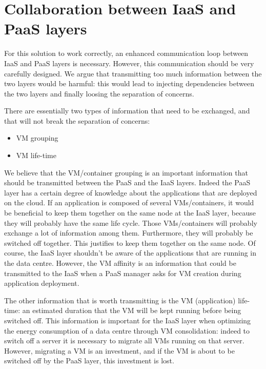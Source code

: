 
\section{Collaboration between IaaS and PaaS layers}
\label{sec:iaaspaas}

For this solution to work correctly, an enhanced communication loop between IaaS and PaaS layers is necessary.
However, this communication should be very carefully designed.
We argue that transmitting too much information between the two layers would be harmful: this would lead to injecting dependencies between the two layers and finally loosing the separation of concerns. 

There are essentially two types of information that need to be exchanged, and that will not break the separation of concerns:
\begin{itemize}
  \item VM grouping
  \item VM life-time
\end{itemize}

We believe that the VM/container grouping is an important information that should be transmitted between the PaaS and the IaaS layers.
Indeed the PaaS layer has a certain degree of knowledge about the applications that are deployed on the cloud.
If an application is composed of several VMs/containers, it would be beneficial to keep them together on the same node at the IaaS layer, because they will probably have the same life cycle.
Those VMs/containers will probably exchange a lot of information among them. Furthermore, they will probably be switched off together.
This justifies to keep them together on the same node.
Of course, the IaaS layer shouldn't be aware of the applications that are running in the data centre.
However, the VM affinity is an information that could be transmitted to the IaaS when a PaaS manager asks for VM creation during application deployment.

The other information that is worth transmitting is the VM (application) life-time: an estimated duration that the VM will be kept running before being switched off.
This information is important for the IaaS layer when optimizing the energy consumption of a data centre through VM consolidation: indeed to switch off a server it is necessary to migrate all VMs running on that server.
However, migrating a VM is an investment, and if the VM is about to be switched off by the PaaS layer, this investment is lost.

